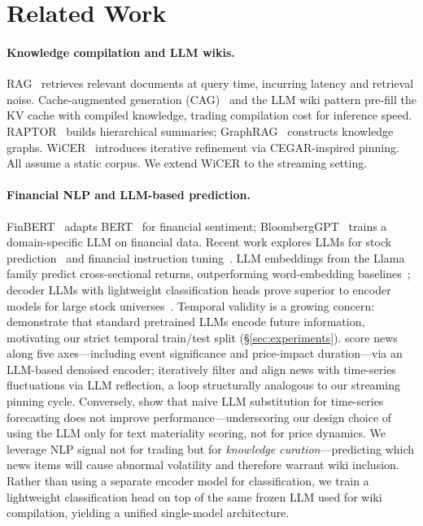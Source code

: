 \documentclass{article}
\begin{document}
\section{Related Work}
\label{sec:related}

\paragraph{Knowledge compilation and LLM wikis.}
RAG~\citep{lewis2020rag} retrieves relevant documents at query time, incurring latency and retrieval noise.
Cache-augmented generation (CAG)~\citep{kang2024cag} and the LLM wiki pattern pre-fill the KV cache with compiled knowledge, trading compilation cost for inference speed.
RAPTOR~\citep{sarthi2024raptor} builds hierarchical summaries; GraphRAG~\citep{edge2024graphrag} constructs knowledge graphs.
WiCER~\citep{huerta2026wicer} introduces iterative refinement via CEGAR-inspired pinning.
All assume a static corpus.
We extend WiCER to the streaming setting.

\paragraph{Financial NLP and LLM-based prediction.}
FinBERT~\citep{araci2019finbert} adapts BERT~\citep{devlin2019bert} for financial sentiment; BloombergGPT~\citep{wu2023bloomberggpt} trains a domain-specific LLM on financial data.
Recent work explores LLMs for stock prediction~\citep{lopez2023chatgpt, xie2023wallstreetneophyte} and financial instruction tuning~\citep{zhang2023instruct, yang2023fingpt}.
LLM embeddings from the Llama family predict cross-sectional returns, outperforming word-embedding baselines~\citep{chen2022llmreturns}; decoder LLMs with lightweight classification heads prove superior to encoder models for large stock universes~\citep{guo2024finetuning}.
Temporal validity is a growing concern: \citet{he2025chrono} demonstrate that standard pretrained LLMs encode future information, motivating our strict temporal train/test split (\S\ref{sec:experiments}).
\citet{li2024causalstock} score news along five axes---including event significance and price-impact duration---via an LLM-based denoised encoder; \citet{wang2024news2forecast} iteratively filter and align news with time-series fluctuations via LLM reflection, a loop structurally analogous to our streaming pinning cycle.
Conversely, \citet{tan2024llm_timeseries} show that naive LLM substitution for time-series forecasting does not improve performance---underscoring our design choice of using the LLM only for text materiality scoring, not for price dynamics.
We leverage NLP signal not for trading but for \emph{knowledge curation}---predicting which news items will cause abnormal volatility and therefore warrant wiki inclusion.
Rather than using a separate encoder model for classification, we train a lightweight classification head on top of the same frozen LLM used for wiki compilation, yielding a unified single-model architecture.
\end{document}
